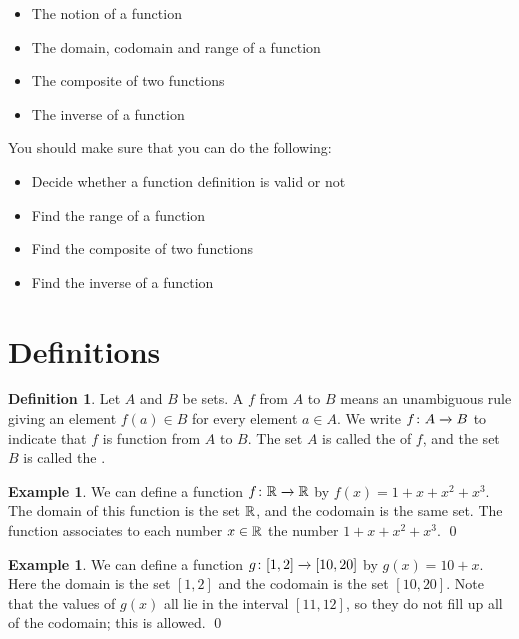 \documentclass[a4paper]{book}
\theoremstyle{definition}
\newtheorem{definition}[theorem]{Definition}
\newtheorem{example}[theorem]{Example}
\begin{document}

\begin{itemize}
 \item The notion of a function
 \item The domain, codomain and range of a function
 \item The composite of two functions
 \item The inverse of a function
\end{itemize}


You should make sure that you can do the following:
\begin{itemize}
 \item Decide whether a function definition is valid or not
 \item Find the range of a function
 \item Find the composite of two functions
 \item Find the inverse of a function
\end{itemize}

\section{Definitions}

\begin{definition}
 Let $A$ and $B$ be sets.  A  $f$ from $A$ to $B$ means
 an unambiguous rule giving an element $f(a)\in B$ for every element
 $a\in A$.  We write $f\colon A\xrightarrow{}B$ to indicate that $f$ is  function
 from $A$ to $B$.  The set $A$ is called the  of $f$, and
 the set $B$ is called the .
\end{definition}
\begin{example}
 We can define a function $f\colon{\mathbb{R}}\xrightarrow{}{\mathbb{R}}$ by $f(x)=1+x+x^2+x^3$.  The
 domain of this function is the set ${\mathbb{R}}$, and the codomain is the same
 set.  The function associates to each number $x\in{\mathbb{R}}$ the number
 $1+x+x^2+x^3$. \qed
\end{example}
\begin{example}
 We can define a function $g\colon[1,2]\xrightarrow{}[10,20]$ by $g(x)=10+x$.
 Here the domain is the set $[1,2]$ and the codomain is the set
 $[10,20]$.  Note that the values of $g(x)$ all lie in the interval
 $[11,12]$, so they do not fill up all of the codomain; this is
 allowed.  \qed
\end{example}
\end{document}

